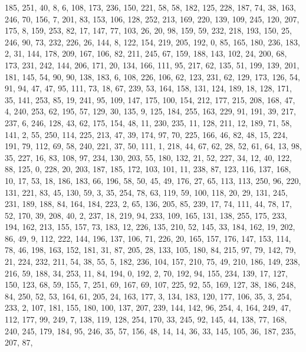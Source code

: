 \begin{DoxyCode}
       185, 251, 40, 8, 6, 108, 173, 236, 150, 221, 58, 58, 182, 125, 228, 187, 74, 38, 163, 246, 70, 156, 7, 201,
       83, 153, 106, 128, 252, 213, 169, 220, 139, 109, 245, 120, 207, 175, 8, 159, 253, 82, 17, 147, 77, 103, 26,
       20, 98, 159, 59, 232, 218, 193, 150, 25, 246, 90, 73, 232, 226, 26, 144, 8, 122, 154, 219, 205, 192, 0, 85,
       165, 180, 236, 183, 2, 31, 144, 178, 209, 167, 106, 82, 211, 245, 67, 159, 188, 143, 102, 24, 200, 68, 173,
       231, 242, 144, 206, 171, 20, 134, 166, 111, 95, 217, 62, 135, 51, 199, 139, 201, 181, 145, 54, 90, 90, 138,
       183, 6, 108, 226, 106, 62, 123, 231, 62, 129, 173, 126, 54, 91, 94, 47, 47, 95, 111, 73, 18, 67, 239, 53,
       164, 158, 131, 124, 189, 18, 128, 171, 35, 141, 253, 85, 19, 241, 95, 109, 147, 175, 100, 154, 212, 177, 215,
       208, 168, 47, 4, 240, 253, 62, 195, 57, 129, 30, 135, 9, 125, 184, 255, 163, 229, 91, 191, 39, 217, 237, 6,
       246, 128, 43, 62, 175, 154, 48, 11, 230, 235, 11, 128, 211, 12, 189, 71, 58, 141, 2, 55, 250, 114, 225, 213,
       47, 39, 174, 97, 70, 225, 166, 46, 82, 48, 15, 224, 191, 79, 112, 69, 58, 240, 221, 37, 50, 111, 1, 218,
       44, 67, 62, 28, 52, 61, 64, 13, 98, 35, 227, 16, 83, 108, 97, 234, 130, 203, 55, 180, 132, 21, 52, 227, 34,
       12, 40, 122, 88, 125, 0, 228, 20, 203, 187, 185, 172, 103, 101, 11, 238, 87, 123, 116, 137, 168, 10, 17, 53,
       18, 186, 183, 66, 196, 58, 50, 45, 49, 176, 27, 65, 113, 113, 250, 96, 220, 131, 221, 83, 45, 130, 59, 3, 35,
       254, 78, 63, 119, 59, 100, 118, 20, 29, 131, 245, 231, 189, 188, 84, 164, 184, 223, 2, 65, 136, 205, 85,
       239, 17, 74, 111, 44, 78, 17, 52, 170, 39, 208, 40, 2, 237, 18, 219, 94, 233, 109, 165, 131, 138, 255, 175,
       233, 194, 162, 213, 155, 157, 73, 183, 12, 226, 135, 210, 52, 145, 33, 184, 162, 19, 202, 86, 49, 9, 112, 222,
       144, 196, 137, 106, 71, 226, 20, 165, 157, 176, 147, 153, 114, 78, 46, 198, 163, 152, 181, 31, 87, 205, 28,
       133, 105, 180, 84, 215, 97, 79, 142, 79, 21, 224, 232, 211, 54, 38, 55, 5, 182, 236, 104, 157, 210, 75, 49,
       210, 186, 149, 238, 216, 59, 188, 34, 253, 11, 84, 194, 0, 192, 2, 70, 192, 94, 155, 234, 139, 17, 127,
       150, 123, 68, 59, 155, 7, 251, 69, 167, 69, 107, 225, 92, 55, 169, 127, 38, 186, 248, 84, 250, 52, 53, 164, 61,
       205, 24, 163, 177, 3, 134, 183, 120, 177, 106, 35, 3, 254, 233, 2, 107, 181, 155, 180, 100, 137, 207, 239,
       144, 142, 96, 254, 4, 164, 249, 47, 112, 177, 99, 249, 7, 138, 119, 128, 254, 170, 33, 245, 92, 145, 44,
       138, 77, 168, 240, 245, 179, 184, 95, 246, 35, 57, 156, 48, 14, 14, 36, 33, 145, 105, 36, 187, 235, 207, 87,

\end{DoxyCode}
